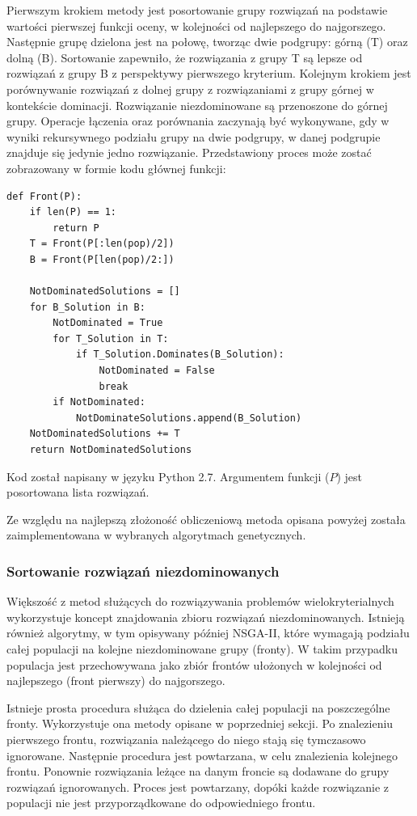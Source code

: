 \documentclass[twoside]{iisthesis}
\begin{document}
Pierwszym krokiem metody jest posortowanie grupy rozwiązań na podstawie wartości pierwszej funkcji oceny, w kolejności od najlepszego do najgorszego. Następnie grupę dzielona jest na połowę, tworząc dwie podgrupy: górną (T) oraz dolną (B). Sortowanie zapewniło, że rozwiązania z grupy T są lepsze od rozwiązań z grupy B z perspektywy pierwszego kryterium. Kolejnym krokiem jest porównywanie rozwiązań z dolnej grupy z rozwiązaniami z grupy górnej w kontekście dominacji. Rozwiązanie niezdominowane są przenoszone do górnej grupy. Operacje łączenia oraz porównania zaczynają być wykonywane, gdy w wyniki rekursywnego podziału grupy na dwie podgrupy, w danej podgrupie znajduje się jedynie jedno rozwiązanie. Przedstawiony proces może zostać zobrazowany w formie kodu głównej funkcji:
\begin{lstlisting}[label=some-code,caption=Znajdowanie rozwiązań niezdominowanych]
def Front(P):
	if len(P) == 1:
		return P
	T = Front(P[:len(pop)/2])
	B = Front(P[len(pop)/2:])
	
	NotDominatedSolutions = []
	for B_Solution in B:
		NotDominated = True
		for T_Solution in T:
			if T_Solution.Dominates(B_Solution):
				NotDominated = False
				break
		if NotDominated:
			NotDominateSolutions.append(B_Solution)
	NotDominatedSolutions += T
	return NotDominatedSolutions
\end{lstlisting}
Kod został napisany w języku Python 2.7. Argumentem funkcji ($P$) jest posortowana lista rozwiązań.

Ze względu na najlepszą złożoność obliczeniową metoda opisana powyżej została zaimplementowana w wybranych algorytmach genetycznych.

\subsubsection{Sortowanie rozwiązań niezdominowanych}
Większość z metod służących do rozwiązywania problemów wielokryterialnych wykorzystuje koncept znajdowania zbioru rozwiązań niezdominowanych. Istnieją również algorytmy, w tym opisywany później NSGA-II, które wymagają podziału całej populacji na kolejne niezdominowane grupy (fronty). W takim przypadku populacja jest przechowywana jako zbiór frontów ułożonych w kolejności od najlepszego (front pierwszy) do najgorszego.

Istnieje prosta procedura służąca do dzielenia całej populacji na poszczególne fronty. Wykorzystuje ona metody opisane w poprzedniej sekcji. Po znalezieniu pierwszego frontu, rozwiązania należącego do niego stają się tymczasowo ignorowane. Następnie procedura jest powtarzana, w celu znalezienia kolejnego frontu. Ponownie rozwiązania leżące na danym froncie są dodawane do grupy rozwiązań ignorowanych. Proces jest powtarzany, dopóki każde rozwiązanie z populacji nie jest przyporządkowane do odpowiedniego frontu.
\end{document}

